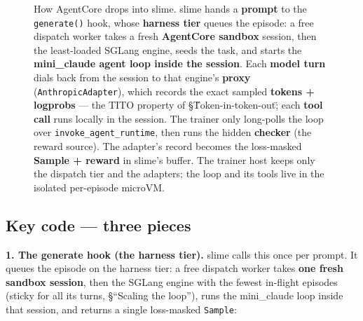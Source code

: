 \documentclass[
  paper=a4,
  ,captions=tableheading
]{scrartcl}
\begin{document}
\begin{figure}[htbp]
{%
}
\caption{How AgentCore drops into slime. slime hands a \textbf{prompt} to the \texttt{generate()} hook, whose \textbf{harness tier} queues the episode: a free dispatch worker takes a fresh \textbf{AgentCore sandbox} session, then the least-loaded SGLang engine, seeds the task, and starts the \textbf{mini\_claude agent loop inside the session}. Each \textbf{model turn} dials back from the session to that engine's \textbf{proxy} (\texttt{AnthropicAdapter}), which records the exact sampled \textbf{tokens + logprobs} --- the TITO property of §\"Token-in-token-out\"; each \textbf{tool call} runs locally in the session. The trainer only long-polls the loop over \texttt{invoke\_agent\_runtime}, then runs the hidden \textbf{checker} (the reward source). The adapter's record becomes the loss-masked \textbf{Sample + reward} in slime's buffer. The trainer host keeps only the dispatch tier and the adapters; the loop and its tools live in the isolated per-episode microVM.}
\end{figure}

\hypertarget{key-code-three-pieces}{%
\subsection{Key code --- three pieces}\label{key-code-three-pieces}}

\textbf{1. The generate hook (the harness tier).} slime calls this once
per prompt. It queues the episode on the harness tier: a free dispatch
worker takes \textbf{one fresh sandbox session}, then the SGLang engine
with the fewest in-flight episodes (sticky for all its turns, §``Scaling
the loop''), runs the mini\_claude loop inside that session, and returns
a single loss-masked \texttt{Sample}:
\end{document}
